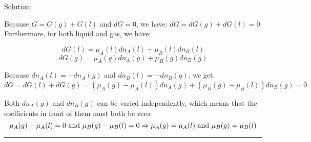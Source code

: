\noindent
\underline{Solution:}

Because $G = G(g) + G(l)$ and $dG = 0$, we have: $dG = dG(g) + dG(l) = 0$. Furthermore, for both liquid and gas, we have:

$$dG(l) = \mu_A(l)dn_A(l) + \mu_B(l)dn_B(l)$$
$$dG(g) = \mu_A(g)dn_A(g) + \mu_B(g)dn_B(g)$$

Because $dn_A(l) = -dn_A(g)$ and $dn_B(l) = -dn_B(g)$, we get:
$$dG = dG(l) + dG(g) = \left(\mu_A(g) - \mu_A(l)\right)dn_A(g) + \left(\mu_B(g) - \mu_B(l)\right)dn_B(g) = 0$$

Both $dn_A(g)$ and $dn_B(g)$ can be varied independently, which means that the coefficients in front of them must both be zero:
$$\mu_A(g) - \mu_A(l) = 0\textnormal{ and }\mu_B(g) - \mu_B(l) = 0\Rightarrow \mu_A(g) = \mu_A(l)\textnormal{ and }\mu_B(g) = \mu_B(l)$$

\hrule\vspace{0.5cm}

